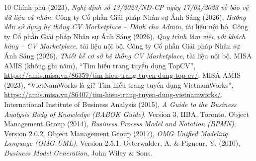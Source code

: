 \documentclass[11pt,a4paper]{article}
\begin{document}
\begin{thebibliography}{10}\small
{} Chính phủ (2023), \emph{Nghị định số 13/2023/NĐ-CP ngày 17/04/2023 về bảo vệ dữ liệu cá nhân}.
 Công ty Cổ phần Giải pháp Nhân sự Ánh Sáng (2026), \emph{Hướng dẫn sử dụng hệ thống CV Marketplace – Dành cho Admin}, tài liệu nội bộ.
 Công ty Cổ phần Giải pháp Nhân sự Ánh Sáng (2026), \emph{Quy trình làm việc với khách hàng – CV Marketplace}, tài liệu nội bộ.
 Công ty Cổ phần Giải pháp Nhân sự Ánh Sáng (2026), \emph{Thiết kế cơ sở hệ thống CV Marketplace}, tài liệu nội bộ.
 MISA AMIS (không ghi năm), “Tìm hiểu trang tuyển dụng TopCV”, \url{https://amis.misa.vn/86359/tim-hieu-trang-tuyen-dung-top-cv/}.
 MISA AMIS (2023), “VietNamWorks là gì? Tìm hiểu trang tuyển dụng VietnamWorks”, \url{https://amis.misa.vn/86407/tim-hieu-trang-tuyen-dung-vietnamworks/}.
 International Institute of Business Analysis (2015), \emph{A Guide to the Business Analysis Body of Knowledge (BABOK Guide)}, Version 3, IIBA, Toronto.
 Object Management Group (2014), \emph{Business Process Model and Notation (BPMN)}, Version 2.0.2.
 Object Management Group (2017), \emph{OMG Unified Modeling Language (OMG UML)}, Version 2.5.1.
 Osterwalder, A. \& Pigneur, Y. (2010), \emph{Business Model Generation}, John Wiley \& Sons.
\end{thebibliography}
\end{document}
